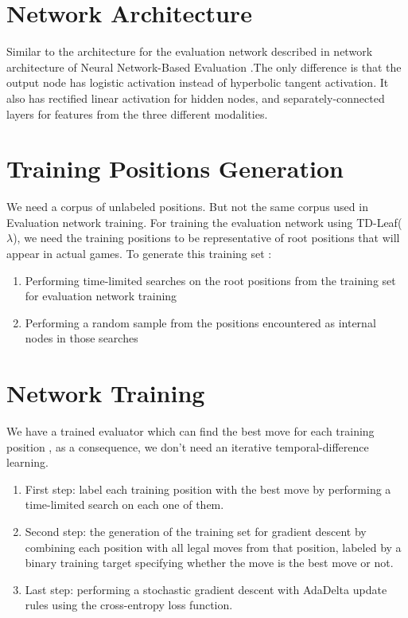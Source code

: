 \documentclass[12pt, a4paper]{report}
\begin{document}
		\section{Network Architecture}
			Similar to the architecture for the evaluation network described in network architecture of Neural Network-Based Evaluation .The only difference is that the output node has logistic activation instead of hyperbolic tangent activation. It also has rectified linear activation for hidden nodes, and separately-connected layers for features from the three different modalities.
		\section{Training Positions Generation}
		We need a corpus of unlabeled positions.
		But not the same corpus used in Evaluation network training.
		For training the evaluation network using TD-Leaf($\lambda$), we need the training positions to be representative of root positions that will appear in actual games.
		To generate this training set :
		\begin{enumerate}
			\item Performing time-limited searches on the root positions from the training set for evaluation network training
			\item Performing a random sample from the positions encountered as internal nodes in those searches
		\end{enumerate}

		\section{Network Training}
			We have a trained evaluator which can find the best move for each training position , as a consequence, we don’t need an iterative temporal-difference learning.
			\begin{enumerate}
				\item First step:
					label each training position with the best move by
					performing a time-limited search on each one of them.
				\item Second step:
					the generation of the training set for gradient descent by combining each position with all legal moves from that position, labeled by a binary training target specifying whether the move is the best move or not.
				\item Last step:
					performing a stochastic gradient descent with AdaDelta update rules using the cross-entropy loss function.
			\end{enumerate}
\end{document}
